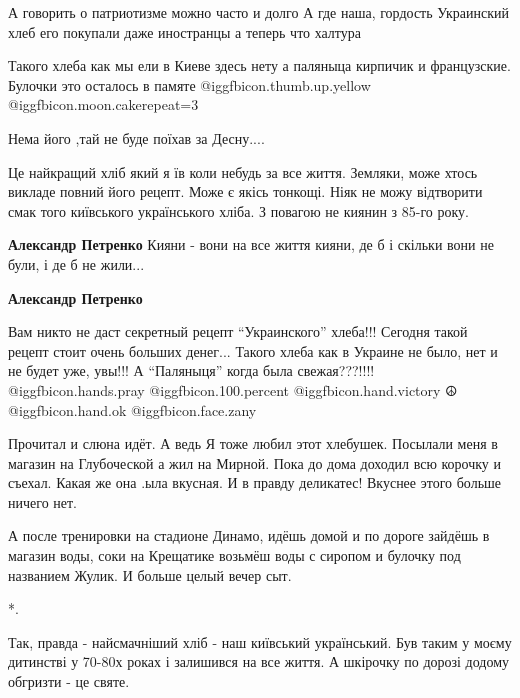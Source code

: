 \begin{itemize}
А говорить о патриотизме можно часто и долго А где наша, гордость Украинский хлеб его покупали даже иностранцы а теперь что халтура

Такого хлеба как мы ели в Киеве здесь нету а паляныца кирпичик и французские.
Булочки это осталось в памяте  @igg{fbicon.thumb.up.yellow}  @igg{fbicon.moon.cake}{repeat=3} 

Нема його ,тай не буде поїхав за Десну....


Це найкращий хліб який я їв коли небудь за все життя. Земляки, може хтось
викладе повний його рецепт. Може є якісь тонкощі. Ніяк не можу відтворити смак
того київського українського хліба. З повагою не киянин з 85-го року.

\begin{itemize} %
\textbf{Александр Петренко} Кияни - вони на все життя кияни, де б і скільки вони не були, і де б не жили...

\textbf{Александр Петренко} 

Вам никто не даст секретный рецепт \enquote{Украинского} хлеба!!! Сегодня такой
рецепт стоит очень больших денег... Такого хлеба как в Украине не было, нет и
не будет уже, увы!!! А \enquote{Паляныця} когда была свежая???!!!!
@igg{fbicon.hands.pray}  @igg{fbicon.100.percent} @igg{fbicon.hand.victory} ☮️ @igg{fbicon.hand.ok}
@igg{fbicon.face.zany} 

\end{itemize} %


Прочитал и слюна идёт. А ведь Я тоже любил этот хлебушек. Посылали меня в
магазин на Глубоческой а жил на Мирной. Пока до дома доходил всю корочку и
съехал. Какая же она .ыла вкусная. И в правду деликатес! Вкуснее этого больше
ничего нет.

А после тренировки на стадионе Динамо, идёшь домой и по дороге зайдёшь в
магазин воды, соки на Крещатике возьмёш воды с сиропом и булочку под названием
Жулик. И больше целый вечер сыт.

*.


Так, правда - найсмачніший хліб - наш київський український. Був таким у моєму
дитинстві у 70-80х роках і залишився на все життя. А шкірочку по дорозі додому
обгризти - це святе.



\end{itemize}
